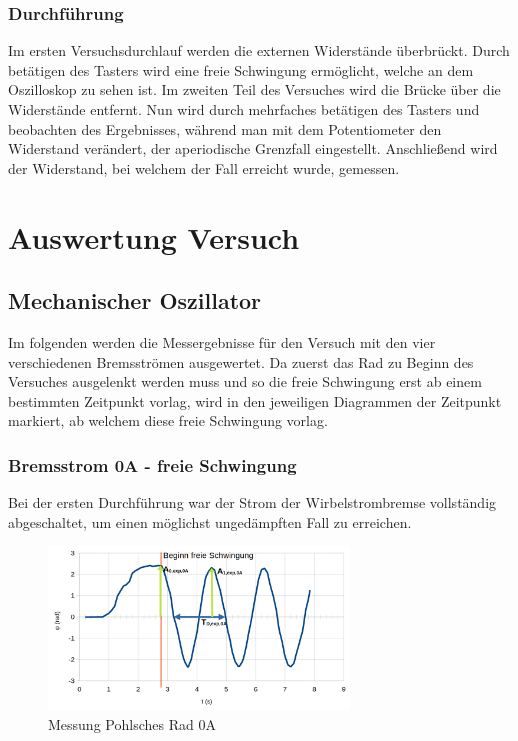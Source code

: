 \documentclass[a4paper]{scrartcl}
\numberwithin{equation}{subsection}
\begin{document}
\subsubsection{Durchführung}
Im ersten Versuchsdurchlauf werden die externen Widerstände überbrückt. Durch betätigen des Tasters wird eine freie Schwingung ermöglicht, welche an dem Oszilloskop zu sehen ist.
Im zweiten Teil des Versuches wird die Brücke über die Widerstände entfernt. Nun wird durch mehrfaches betätigen des Tasters und beobachten des Ergebnisses, während man mit dem Potentiometer den Widerstand verändert, der aperiodische Grenzfall eingestellt. 
Anschließend wird der Widerstand, bei welchem der Fall erreicht wurde, gemessen.

\newpage

\section{Auswertung Versuch}
\subsection{Mechanischer Oszillator}
Im folgenden werden die Messergebnisse für den Versuch mit den vier verschiedenen Bremsströmen ausgewertet. Da zuerst das Rad zu Beginn des Versuches ausgelenkt werden muss und so die freie Schwingung erst ab einem bestimmten Zeitpunkt vorlag, wird in den jeweiligen Diagrammen der Zeitpunkt markiert, ab welchem diese freie Schwingung vorlag.

\subsubsection{Bremsstrom 0A - freie Schwingung}
Bei der ersten Durchführung war der Strom der Wirbelstrombremse vollständig abgeschaltet, um einen möglichst ungedämpften Fall zu erreichen.

\begin{figure}[H]
\includegraphics[width=8cm]{Messung_Rad_graph_0A}
\centering
\caption{Messung Pohlsches Rad 0A}
\centering
\end{figure}
\end{document}
